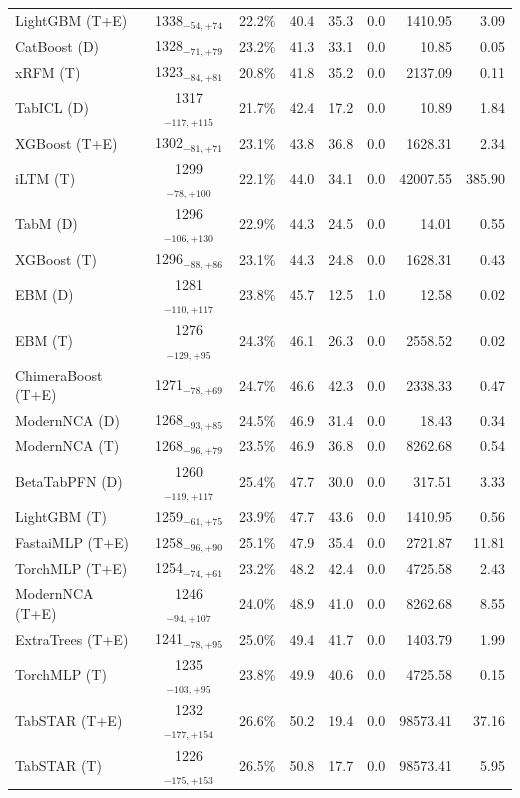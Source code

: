 \begin{tabular}{lcccccrr}
LightGBM (T+E) & 1338${}_{-54,+74}$ & 22.2\% & 40.4 & 35.3 & 0.0 & 1410.95 & 3.09 \\
CatBoost (D) & 1328${}_{-71,+79}$ & 23.2\% & 41.3 & 33.1 & 0.0 & 10.85 & 0.05 \\
xRFM (T) & 1323${}_{-84,+81}$ & 20.8\% & 41.8 & 35.2 & 0.0 & 2137.09 & 0.11 \\
TabICL (D) & 1317${}_{-117,+115}$ & 21.7\% & 42.4 & 17.2 & 0.0 & 10.89 & 1.84 \\
XGBoost (T+E) & 1302${}_{-81,+71}$ & 23.1\% & 43.8 & 36.8 & 0.0 & 1628.31 & 2.34 \\
iLTM (T) & 1299${}_{-78,+100}$ & 22.1\% & 44.0 & 34.1 & 0.0 & 42007.55 & 385.90 \\
TabM (D) & 1296${}_{-106,+130}$ & 22.9\% & 44.3 & 24.5 & 0.0 & 14.01 & 0.55 \\
XGBoost (T) & 1296${}_{-88,+86}$ & 23.1\% & 44.3 & 24.8 & 0.0 & 1628.31 & 0.43 \\
EBM (D) & 1281${}_{-110,+117}$ & 23.8\% & 45.7 & 12.5 & 1.0 & 12.58 & 0.02 \\
EBM (T) & 1276${}_{-129,+95}$ & 24.3\% & 46.1 & 26.3 & 0.0 & 2558.52 & 0.02 \\
ChimeraBoost (T+E) & 1271${}_{-78,+69}$ & 24.7\% & 46.6 & 42.3 & 0.0 & 2338.33 & 0.47 \\
ModernNCA (D) & 1268${}_{-93,+85}$ & 24.5\% & 46.9 & 31.4 & 0.0 & 18.43 & 0.34 \\
ModernNCA (T) & 1268${}_{-96,+79}$ & 23.5\% & 46.9 & 36.8 & 0.0 & 8262.68 & 0.54 \\
BetaTabPFN (D) & 1260${}_{-119,+117}$ & 25.4\% & 47.7 & 30.0 & 0.0 & 317.51 & 3.33 \\
LightGBM (T) & 1259${}_{-61,+75}$ & 23.9\% & 47.7 & 43.6 & 0.0 & 1410.95 & 0.56 \\
FastaiMLP (T+E) & 1258${}_{-96,+90}$ & 25.1\% & 47.9 & 35.4 & 0.0 & 2721.87 & 11.81 \\
TorchMLP (T+E) & 1254${}_{-74,+61}$ & 23.2\% & 48.2 & 42.4 & 0.0 & 4725.58 & 2.43 \\
ModernNCA (T+E) & 1246${}_{-94,+107}$ & 24.0\% & 48.9 & 41.0 & 0.0 & 8262.68 & 8.55 \\
ExtraTrees (T+E) & 1241${}_{-78,+95}$ & 25.0\% & 49.4 & 41.7 & 0.0 & 1403.79 & 1.99 \\
TorchMLP (T) & 1235${}_{-103,+95}$ & 23.8\% & 49.9 & 40.6 & 0.0 & 4725.58 & 0.15 \\
TabSTAR (T+E) & 1232${}_{-177,+154}$ & 26.6\% & 50.2 & 19.4 & 0.0 & 98573.41 & 37.16 \\
TabSTAR (T) & 1226${}_{-175,+153}$ & 26.5\% & 50.8 & 17.7 & 0.0 & 98573.41 & 5.95 \\

\end{tabular}
